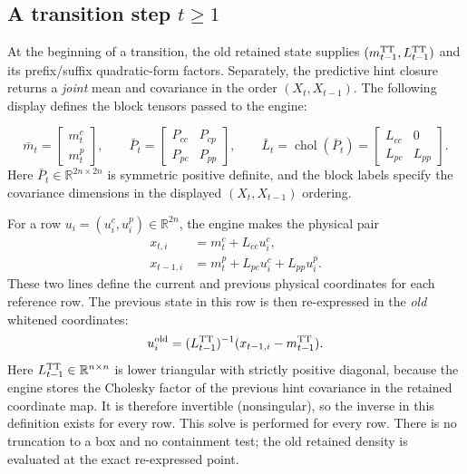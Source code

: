 \documentclass[11pt]{article}
\begin{document}
\subsection{A transition step $t\geq1$}

At the beginning of a transition, the old retained state supplies
$(m_{t-1}^{\rm TT},L_{t-1}^{\rm TT})$ and its prefix/suffix quadratic-form
factors.  Separately, the predictive hint closure returns a \emph{joint}
mean and covariance in the order $(X_t,X_{t-1})$.  The following display
defines the block tensors passed to the engine:

\begin{equation}
  \bar m_t=\begin{bmatrix}m_t^c\\m_t^p\end{bmatrix},
  \qquad
  \bar P_t=\begin{bmatrix}P_{cc}&P_{cp}\\P_{pc}&P_{pp}\end{bmatrix},
  \qquad
  \bar L_t=\operatorname{chol}(\bar P_t)
  =\begin{bmatrix}L_{cc}&0\\L_{pc}&L_{pp}\end{bmatrix}.
  \label{eq:actual-joint-hint}
\end{equation}
Here $\bar P_t\in\mathbb R^{2n\times2n}$ is symmetric positive definite,
and the block labels specify the covariance dimensions in the displayed
$(X_t,X_{t-1})$ ordering.

For a row $u_i=(u_i^c,u_i^p)\in\mathbb R^{2n}$, the engine makes the
physical pair
\begin{align}
  x_{t,i}&=m_t^c+L_{cc}u_i^c,
  \label{eq:actual-current-map}\\
  x_{t-1,i}&=m_t^p+L_{pc}u_i^c+L_{pp}u_i^p.
  \label{eq:actual-previous-map}
\end{align}
These two lines define the current and previous physical coordinates for each
reference row.
The previous state in this row is then re-expressed in the \emph{old}
whitened coordinates:
\begin{equation}
  u_i^{\rm old}=(L_{t-1}^{\rm TT})^{-1}
       (x_{t-1,i}-m_{t-1}^{\rm TT}).
  \label{eq:actual-old-reexpression}
\end{equation}
Here $L_{t-1}^{\rm TT}\in\mathbb R^{n\times n}$ is lower triangular with
strictly positive diagonal, because the engine stores the Cholesky factor of
the previous hint covariance in the retained coordinate map.  It is therefore
invertible (nonsingular), so the inverse in this definition exists for every
row.
This solve is performed for every row.  There is no truncation to a box and
no containment test; the old retained density is evaluated at the exact
re-expressed point.
\end{document}
